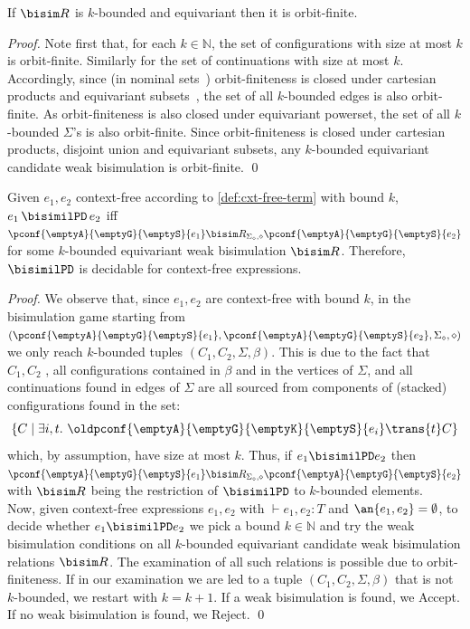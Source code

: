 \begin{lemma}
  If $\bisim R$ is $k$-bounded and equivariant then it is orbit-finite.
\end{lemma}
\begin{proof}
  Note first that, for each $k\in\mathbb N$, the set of configurations with size at most $k$
  is orbit-finite. Similarly for the set %
  of continuations with size at most $k$. Accordingly, since (in nominal sets~\cite{PittsNominal}) orbit-finiteness is closed under cartesian products and equivariant subsets~\cite{BojanczykKL14}, the set of all $k$-bounded edges is also orbit-finite.
  As orbit-finiteness is also closed under equivariant powerset, the set of all $k$-bounded $\Sigma$'s is also orbit-finite. Since orbit-finiteness is closed under cartesian products, disjoint union and equivariant subsets, any $k$-bounded equivariant candidate weak bisimulation is orbit-finite. \qed
\end{proof}
\begin{theorem}\label{thm:decide}
  Given $e_1,e_2$ context-free {according to \cref{def:cxt-free-term}} with bound $k$,
  $e_1\, {\bisimilPD}\, e_2$ iff
  $\pconf{\emptyA}{\emptyG}{\emptyS}{e_1} \bisim R_{\Sigma_\diamond,\diamond}
  \pconf{\emptyA}{\emptyG}{\emptyS}{e_2}$
  for some $k$-bounded equivariant weak bisimulation $\bisim R$. Therefore, $\bisimilPD$ is decidable for context-free expressions.
\end{theorem}
\begin{proof}
  We observe that, since $e_1,e_2$ are context-free with bound $k$, in the bisimulation game starting from $(\pconf{\emptyA}{\emptyG}{\emptyS}{e_1},\pconf{\emptyA}{\emptyG}{\emptyS}{e_2},\Sigma_\diamond,\diamond)$ we only reach $k$-bounded tuples $(C_1,C_2,\Sigma,\beta)$. This is due to the fact that $C_1,C_2$ , all configurations contained in $\beta$ and in the vertices of $\Sigma$, and all continuations found in edges of $\Sigma$ are all sourced from components of (stacked) configurations found in the set:
  \[
    \{C\mid \exists i,t.\ \oldpconf{\emptyA}{\emptyG}{\emptyK}{\emptyS}{e_i}\trans{t}C\}
  \]
  which, by assumption, have size at most $k$. Thus,
  if $e_1  \bisimilPD e_2$ then 
  $\pconf{\emptyA}{\emptyG}{\emptyS}{e_1} \bisim R_{\Sigma_\diamond,\diamond}
  \pconf{\emptyA}{\emptyG}{\emptyS}{e_2}$ with $\bisim R$ being the restriction of $\bisimilPD$ to $k$-bounded elements. \\
  Now, given context-free expressions $e_1,e_2$ with $\vdash e_1,e_2:T$ and $\an{e_1,e_2}=\emptyset$, to decide whether $e_1 \bisimilPD e_2$ we pick a bound $k\in\mathbb{N}$ and try the weak bisimulation conditions on all $k$-bounded equivariant candidate weak bisimulation relations $\bisim R$.
  The examination of all such relations is possible due to orbit-finiteness.
  If in our examination we are led to a tuple $(C_1,C_2,\Sigma,\beta)$ that is not $k$-bounded, we restart with $k=k+1$.
  If a weak bisimulation is found, we Accept. If no weak bisimulation is found, we Reject.
\qed
\end{proof}

